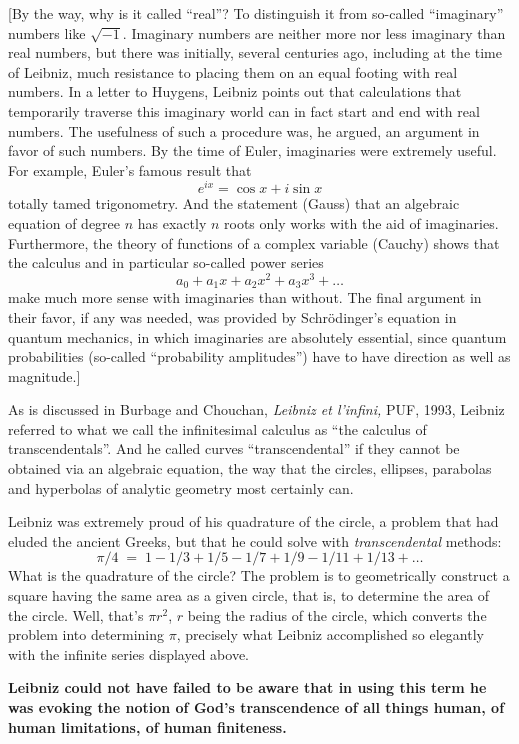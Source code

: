 \documentclass[12pt]{book}
\begin{document}
{\footnotesize
[By the way,
why is it called ``real''? To distinguish it from so-called ``imaginary'' numbers like $\sqrt{-1}$.
Imaginary numbers are neither more nor less imaginary than real numbers, but there was initially,
several centuries ago, including at the time of Leibniz, much resistance to placing them on 
an equal footing with real numbers.  In a letter to Huygens, Leibniz points out that calculations
that temporarily traverse this imaginary world can in fact start and end with real numbers.
The usefulness of such a procedure was, he argued, an argument in favor of such numbers.
By the time of Euler, imaginaries were extremely useful. For example, Euler's famous result
that 
\[
   e^{i x} = \cos x + i \sin x 
\] 
totally tamed trigonometry.
And the statement (Gauss)
that an algebraic equation of degree $n$ has exactly $n$ roots only works with the 
aid of imaginaries. Furthermore, the theory of functions of a complex variable (Cauchy)
shows that the calculus and in particular so-called power series
\[
   a_0 + a_1 x + a_2 x^2 + a_3 x^3 + \ldots
\] 
make much more sense with imaginaries than without.
The final argument in their favor, if any was needed, was provided by Schr\"odinger's equation
in quantum mechanics, in which imaginaries are absolutely essential, since quantum probabilities
(so-called ``probability amplitudes'') have to have direction as well as magnitude.]
}

\medskip

As is discussed in Burbage and Chouchan, \emph{Leibniz et l'infini,} PUF, 1993,
Leibniz referred to what we call the infinitesimal calculus as ``the calculus of
transcendentals''. And he called curves ``transcendental'' if they cannot be obtained via
an algebraic equation, the way that the circles, ellipses, parabolas and hyperbolas
of analytic geometry most certainly can.  
 
Leibniz was extremely proud of his quadrature of the circle, a problem that had eluded
the ancient Greeks, but that he could solve with \emph{transcendental} methods:
\[
 \pi/4 \; = \; 1 - 1/3 + 1/5 - 1/7 + 1/9 - 1/11 + 1/13 + \ldots
\] 
What is the quadrature of the circle? 
The problem is to geometrically construct a square having the same area as a given circle, that
is, to determine the area of the circle. Well, that's $\pi r^2$, $r$ being the radius
of the circle, which converts the problem into determining $\pi$, precisely what Leibniz accomplished
so elegantly with the infinite series displayed above.
 
\textbf{
Leibniz could not have failed to be aware that in using this term he was evoking
the notion of God's transcendence of all things human, of human limitations, of
human finiteness.
}
 
\end{document}
